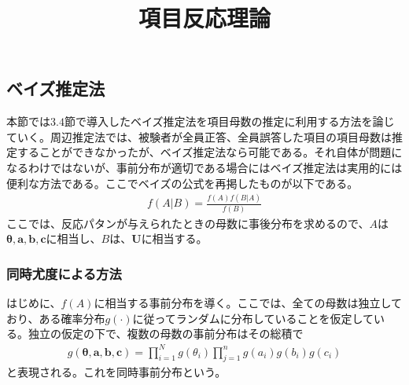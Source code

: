 \documentclass[12pt]{jarticle}
\title{項目反応理論}
\begin{document}
\maketitle
\setcounter{section}{3}
\setcounter{subsection}{3}
\subsection{ベイズ推定法}
本節では$3.4$節で導入したベイズ推定法を項目母数の推定に利用する方法を論じていく。周辺推定法では、被験者が全員正答、全員誤答した項目の項目母数は推定することができなかったが、ベイズ推定法なら可能である。それ自体が問題になるわけではないが、事前分布が適切である場合にはベイズ推定法は実用的には便利な方法である。ここでベイズの公式を再掲したものが以下である。
\begin{align}
  \label{00}
  \displaystyle f(A|B) = \frac{f(A)f(B|A)}{f(B)}\tag{4.29}
\end{align}
ここでは、反応パタンが与えられたときの母数に事後分布を求めるので、$A$は$\boldsymbol{\theta,a,b,c}$に相当し、$B$は、$\boldsymbol{U}$に相当する。
\subsubsection{同時尤度による方法}
はじめに、$f(A)$に相当する事前分布を導く。ここでは、全ての母数は独立しており、ある確率分布$g(\cdot)$に従ってランダムに分布していることを仮定している。独立の仮定の下で、複数の母数の事前分布はその総積で
\begin{align}
  \label{01}
  \displaystyle
  g(\boldsymbol{\theta,a,b,c}) = \prod_{i = 1}^{N}g(\theta_i) \prod_{j = 1}^{n} g(a_i)g(b_i)g(c_i)  \tag{4.30}
\end{align}
と表現される。これを同時事前分布という。


\end{document}
